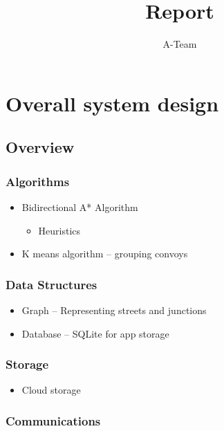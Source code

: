 \documentclass{article}
\title{Report}
\author{A-Team}
\begin{document}
\maketitle

\section{Overall system design}
\subsection{Overview}
\subsubsection{Algorithms}
\begin{itemize}
	\item Bidirectional A* Algorithm
    	\begin{itemize}
        	\item Heuristics
        \end{itemize}
	\item K means algorithm -- grouping convoys
\end{itemize}
\subsubsection{Data Structures}
\begin{itemize}
	\item Graph -- Representing streets and junctions
    \item Database -- SQLite for app storage    
\end{itemize}
\subsubsection{Storage}
\begin{itemize}
	\item Cloud storage
\end{itemize}
\subsubsection{Communications}
\end{document}
